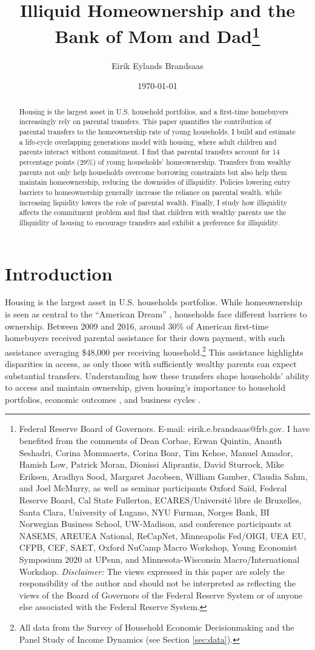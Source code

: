 \documentclass[12pt]{article}
\title{{\LARGE Illiquid Homeownership and the \\ Bank of Mom and Dad}\thanks{Federal Reserve Board of Governors. E-mail: eirik.e.brandsaas@frb.gov. I have benefited from the comments of Dean Corbae, Erwan Quintin, Ananth Seshadri, Corina Mommaerts, Corina Boar, Tim Kehoe, Manuel Amador, Hamish Low, Patrick Moran, Dionissi Aliprantis, David Sturrock, Mike Eriksen, Aradhya Sood, Margaret Jacobsen, William Gamber, Claudia Sahm, and Joel McMurry, as well as seminar participants Oxford Sa{\"i}d, Federal Reserve Board, Cal State Fullerton, ECARES/Université libre de Bruxelles, Santa Clara, University of Lugano, NYU Furman, Norges Bank, BI Norwegian Business School, UW-Madison, and conference participants at NASEMS, AREUEA National, ReCapNet, Minneapolis Fed/OIGI, UEA EU, CFPB, CEF, SAET, Oxford NuCamp Macro Workshop, Young Economist Symposium 2020 at UPenn, and Minnesota-Wisconsin Macro/International Workshop. \textit{Disclaimer: }The views expressed in this paper are solely the responsibility of the author and should not be interpreted as reflecting the views of the Board of Governors of the Federal Reserve System or of anyone else associated with the Federal Reserve System.}}
\author{Eirik Eylands Brandsaas}
\date{{\today }}
\begin{document}
\maketitle
\begin{abstract}
{\begin{spacing}{1.2}
Housing is the largest asset in U.S. household portfolios, and a first-time homebuyers increasingly rely on parental transfers. This paper quantifies the contribution of parental transfers to the homeownership rate of young households. I build and estimate a life-cycle overlapping generations model with housing, where adult children and parents interact without commitment. I find that parental transfers account for 14 percentage points (29\%) of young households' homeownership. Transfers from wealthy parents not only help households overcome borrowing constraints but also help them maintain homeownership, reducing the downsides of illiquidity. Policies lowering entry barriers to homeownership generally increase the reliance on parental wealth, while increasing liquidity lowers the role of parental wealth. Finally, I study how illiquidity affects the commitment problem and find that children with wealthy parents use the illiquidity of housing to encourage transfers and exhibit a preference for illiquidity.
\end{spacing}}
\end{abstract}
\newpage
\onehalfspacing

\section{Introduction}
Housing is the largest asset in U.S. households portfolios. While homeownership is seen as central to the ``American Dream'' \citep{goodman2018homeownership}, households face different barriers to ownership. Between 2009 and 2016, around 30\% of American first-time homebuyers received parental assistance for their down payment, with such assistance averaging \$48,000 per receiving household.\footnote{All data from the Survey of Household Economic Decisionmaking and the Panel Study of Income Dynamics (see Section \ref{sec:data}).} This assistance highlights disparities in access, as only those with sufficiently wealthy parents can expect substantial transfers. Understanding how these transfers shape households' ability to access and maintain ownership, given housing’s importance to household portfolios, economic outcomes \citep{sodini2023identifying}, and business cycles \citep{Kaplan2020,favilukis2017macroeconomic}.
\end{document}
